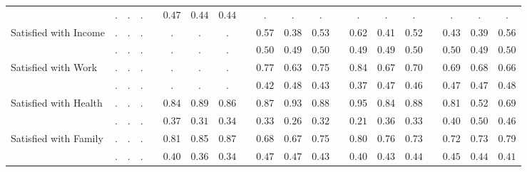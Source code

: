 \begin{center}
{\begin{longtable}{L{5cm} c c c p{.5cm} c c c p{.5cm} c c c p{.5cm} c c c p{.5cm} c c c}
& $\mathit{        .}$ & $\mathit{        .}$ & $\mathit{        .}$ & & $\mathit{     0.47}$ & $\mathit{     0.44}$ & $\mathit{     0.44}$ & & $\mathit{        .}$ & $\mathit{        .}$ & $\mathit{        .}$ & & $\mathit{        .}$ & $\mathit{        .}$ & $\mathit{        .}$ & & $\mathit{        .}$ & $\mathit{        .}$ & $\mathit{        .}$ \\[.7em]
Satisfied with Income & . &         . &         . & &         . &         . &         . & &      0.57 &      0.38 &      0.53 & &      0.62 &      0.41 &      0.52 & &      0.43 &      0.39 &      0.56 \\*
& $\mathit{        .}$ & $\mathit{        .}$ & $\mathit{        .}$ & & $\mathit{        .}$ & $\mathit{        .}$ & $\mathit{        .}$ & & $\mathit{     0.50}$ & $\mathit{     0.49}$ & $\mathit{     0.50}$ & & $\mathit{     0.49}$ & $\mathit{     0.49}$ & $\mathit{     0.50}$ & & $\mathit{     0.50}$ & $\mathit{     0.49}$ & $\mathit{     0.50}$ \\[.7em]
Satisfied with Work & . &         . &         . & &         . &         . &         . & &      0.77 &      0.63 &      0.75 & &      0.84 &      0.67 &      0.70 & &      0.69 &      0.68 &      0.66 \\*
& $\mathit{        .}$ & $\mathit{        .}$ & $\mathit{        .}$ & & $\mathit{        .}$ & $\mathit{        .}$ & $\mathit{        .}$ & & $\mathit{     0.42}$ & $\mathit{     0.48}$ & $\mathit{     0.43}$ & & $\mathit{     0.37}$ & $\mathit{     0.47}$ & $\mathit{     0.46}$ & & $\mathit{     0.47}$ & $\mathit{     0.47}$ & $\mathit{     0.48}$ \\[.7em]
Satisfied with Health & . &         . &         . & &      0.84 &      0.89 &      0.86 & &      0.87 &      0.93 &      0.88 & &      0.95 &      0.84 &      0.88 & &      0.81 &      0.52 &      0.69 \\*
& $\mathit{        .}$ & $\mathit{        .}$ & $\mathit{        .}$ & & $\mathit{     0.37}$ & $\mathit{     0.31}$ & $\mathit{     0.34}$ & & $\mathit{     0.33}$ & $\mathit{     0.26}$ & $\mathit{     0.32}$ & & $\mathit{     0.21}$ & $\mathit{     0.36}$ & $\mathit{     0.33}$ & & $\mathit{     0.40}$ & $\mathit{     0.50}$ & $\mathit{     0.46}$ \\[.7em]
Satisfied with Family & . &         . &         . & &      0.81 &      0.85 &      0.87 & &      0.68 &      0.67 &      0.75 & &      0.80 &      0.76 &      0.73 & &      0.72 &      0.73 &      0.79 \\*
& $\mathit{        .}$ & $\mathit{        .}$ & $\mathit{        .}$ & & $\mathit{     0.40}$ & $\mathit{     0.36}$ & $\mathit{     0.34}$ & & $\mathit{     0.47}$ & $\mathit{     0.47}$ & $\mathit{     0.43}$ & & $\mathit{     0.40}$ & $\mathit{     0.43}$ & $\mathit{     0.44}$ & & $\mathit{     0.45}$ & $\mathit{     0.44}$ & $\mathit{     0.41}$ \\[.7em]

\end{longtable}}
\end{center}
